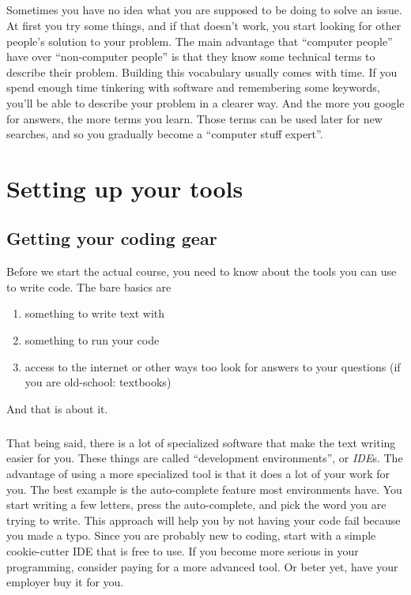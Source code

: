 \documentclass[11pt,fleqn]{book} %
\begin{document}
\paragraph{} Sometimes you have no idea what you are supposed to be doing to solve an issue. At first you try some things, and if that doesn't work, you start looking for other people's solution to your problem. The main advantage that ``computer people'' have over ``non-computer people'' is that they know some technical terms to describe their problem.
Building this vocabulary usually comes with time. If you spend enough time tinkering with software and remembering some keywords, you'll be able to describe your problem in a clearer way.
And the more you google for answers, the more terms you learn. Those terms can be used later for new searches, and so you gradually become a ``computer stuff expert''.

\chapter{Setting up your tools}

\section{Getting your coding gear}
Before we start the actual course, you need to know about the tools you can use to write code.
The bare basics are
\begin{enumerate}
\item  something to write text with
\item something to run your code
\item access to the internet or other ways too look for answers to your questions (if you are old-school: textbooks)
\end{enumerate}
And that is about it.

\paragraph{}That being said, there is a lot of specialized software that make the text writing easier for you. These things are called ``development environments'', or \emph{IDE}s.
The advantage of using a more specialized tool is that it does a lot of your work for you. The best example is the auto-complete feature most environments have. 
You start writing a few letters, press the auto-complete, and pick the word you are trying to write. This approach will help you by not having your code fail because you made a typo.
Since you are probably new to coding, start with a simple cookie-cutter IDE that is free to use. If you become more serious in your programming, consider paying for a more advanced tool. Or beter yet, have your employer buy it for you.
\end{document}

